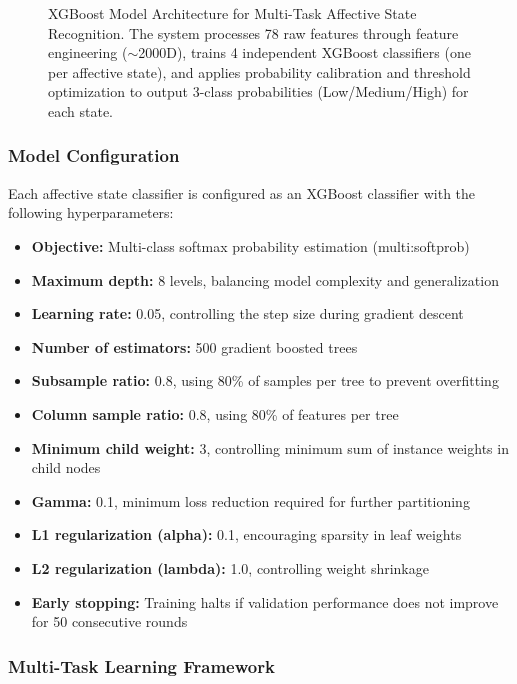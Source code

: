 \documentclass[11pt,a4paper]{article}
\begin{document}
\begin{figure}[htbp]
\begin{tikzpicture}
  \end{tikzpicture}
  \caption{XGBoost Model Architecture for Multi-Task Affective State Recognition. The system processes 78 raw features through feature engineering ($\sim$2000D), trains 4 independent XGBoost classifiers (one per affective state), and applies probability calibration and threshold optimization to output 3-class probabilities (Low/Medium/High) for each state.}
  \label{fig:xgboost_architecture}
\end{figure}

\subsubsection{Model Configuration}

Each affective state classifier is configured as an XGBoost classifier with the following hyperparameters:

\begin{itemize}
  \item \textbf{Objective:} Multi-class softmax probability estimation (multi:softprob)
  \item \textbf{Maximum depth:} 8 levels, balancing model complexity and generalization
  \item \textbf{Learning rate:} 0.05, controlling the step size during gradient descent
  \item \textbf{Number of estimators:} 500 gradient boosted trees
  \item \textbf{Subsample ratio:} 0.8, using 80\% of samples per tree to prevent overfitting
  \item \textbf{Column sample ratio:} 0.8, using 80\% of features per tree
  \item \textbf{Minimum child weight:} 3, controlling minimum sum of instance weights in child nodes
  \item \textbf{Gamma:} 0.1, minimum loss reduction required for further partitioning
  \item \textbf{L1 regularization (alpha):} 0.1, encouraging sparsity in leaf weights
  \item \textbf{L2 regularization (lambda):} 1.0, controlling weight shrinkage
  \item \textbf{Early stopping:} Training halts if validation performance does not improve for 50 consecutive rounds
\end{itemize}

\subsubsection{Multi-Task Learning Framework}
\end{document}
